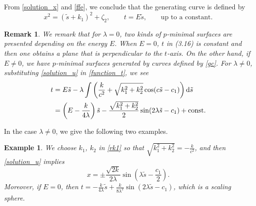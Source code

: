 \documentclass[pdftex]{sigma}
\numberwithin{equation}{section}
\newtheorem{Example}[Theorem]{Example}
\newtheorem{Remark}[Theorem]{Remark} }
\begin{document}
From \eqref{solution_x} and \eqref{ffe}, we conclude that the generating curve is defined by
\begin{equation}\label{gc}
x^{2}=(\tilde{s}+k_1)^{2}+\zeta_{2},\qquad
t=E\tilde{s},\qquad \textrm{up to a constant}.
\end{equation}


\begin{Remark} We remark that for $\lambda=0$, two kinds of $p$-minimal surfaces are presented depending on the energy $E$. When $E=0$, $t$ in (3.16) is constant and then one obtains a plane that is perpendicular to the $t$-axis. On the other hand, if $E\neq 0$, we have $p$-minimal surfaces generated by curves defined by \eqref{gc}. For $\lambda \neq 0$, substituting \eqref{solution_u} in \eqref{function_t}, we
see
\begin{align*}
t&=E\tilde s-\lambda \int \left(\frac{k}{c^2}+\sqrt{k_1^2+k_2^2}\cos(c\tilde
s-c_1)\right){\rm d}\tilde s \\
&=\left(E-\frac{k}{4\lambda}\right)\tilde s-\frac{\sqrt{k_1^2+k_2^2}}{2}\sin(2\lambda
\tilde s-c_1)+\text{\rm const}.
\end{align*}
\end{Remark}
In the case $\lambda \neq 0$, we give the following two examples.


\begin{Example}
We choose $k_1$, $k_2$ in \eqref{rk1} so that $\sqrt{k_1^2+k_2^2}=-\frac{k}{c^2}$, and then
\eqref{solution_u} implies
\begin{equation*}
x=\pm \frac{\sqrt{2k}}{2\lambda} \sin\left(\lambda \tilde s-\frac{c_1}{2}\right).
\end{equation*}
Moreover, if $E=0$, then $t=-\frac{k}{4\lambda}\tilde s+\frac{k}{8\lambda^2}
\sin(2\lambda \tilde s-c_1)$, which is a scaling sphere.
\end{Example}
\end{document}
